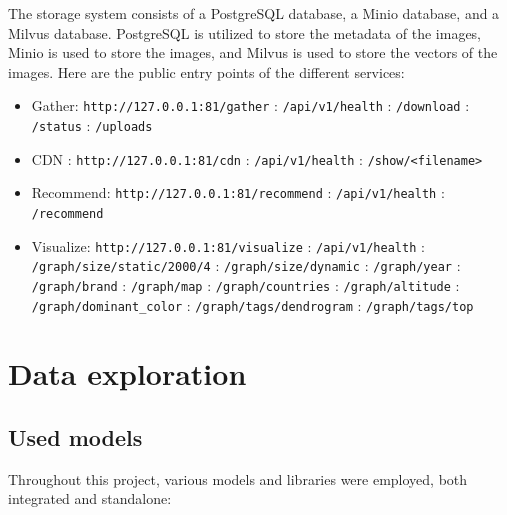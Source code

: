 \documentclass{article}
\begin{document}
    The storage system consists of a PostgreSQL database, a Minio database, and a Milvus database. PostgreSQL is utilized to store the metadata of the images, Minio is used to store the images, and Milvus is used to store the vectors of the images.
    Here are the public entry points of the different services:

    \begin{itemize}
        \item Gather: \texttt{http://127.0.0.1:81/gather}
        \subitem [GET]: \texttt{/api/v1/health}
        \subitem [GET]: \texttt{/download}
        \subitem [GET]: \texttt{/status}
        \subitem [POST]: \texttt{/uploads}
        \item CDN : \texttt{http://127.0.0.1:81/cdn}
        \subitem [GET]: \texttt{/api/v1/health}
        \subitem [GET]: \texttt{/show/<filename>}
        \item Recommend: \texttt{http://127.0.0.1:81/recommend}
        \subitem [GET]: \texttt{/api/v1/health}
        \subitem [POST]: \texttt{/recommend}
        \item Visualize: \texttt{http://127.0.0.1:81/visualize}
        \subitem [GET]: \texttt{/api/v1/health}
        \subitem [GET]: \texttt{/graph/size/static/2000/4}
        \subitem [GET]: \texttt{/graph/size/dynamic}
        \subitem [GET]: \texttt{/graph/year}
        \subitem [GET]: \texttt{/graph/brand}
        \subitem [GET]: \texttt{/graph/map}
        \subitem [GET]: \texttt{/graph/countries}
        \subitem [GET]: \texttt{/graph/altitude}
        \subitem [GET]: \texttt{/graph/dominant_color}
        \subitem [GET]: \texttt{/graph/tags/dendrogram}
        \subitem [GET]: \texttt{/graph/tags/top}
    \end{itemize}



    \section{Data exploration}\label{sec:exploration}

    \subsection{Used models}\label{subsec:models}
    Throughout this project, various models and libraries were employed, both integrated and standalone:
\end{document}
